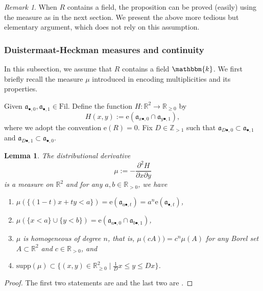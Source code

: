 \documentclass[11pt, leqno]{amsart}%
\theoremstyle{plain}
\newtheorem{lemma}[theorem]{Lemma}
\theoremstyle{definition}
\theoremstyle{remark}
\newtheorem{remark}[theorem]{Remark}
\newcommand{\bR}{\mathbb{R}}
\newcommand{\bZ}{\mathbb{Z}}
\newcommand{\fa}{\mathfrak{a}}
\newcommand{\supp}{\mathrm{supp}}
\newcommand{\bk}{\mathbbm{k}}
\newcommand{\e}{\mathrm{e}}
\newcommand{\Fil}{\mathrm{Fil}}
\numberwithin{equation}{section}
\begin{document}
\begin{remark}
    When $R$ contains a field, the proposition can be proved (easily) using the measure as in the next section. We present the above more tedious but elementary argument, which does not rely on this assumption.
\end{remark}







\subsubsection{Duistermaat-Heckman measures and continuity}

In this subsection, we assume that $R$ contains a field $\bk$. We first briefly recall the measure $\mu$ introduced in \cite[Section 4]{BLQ22} encoding multiplicities and its properties.

Given $\fa_{\bullet,0},\fa_{\bullet,1}\in\Fil$. Define the function $H:\bR^2\to \bR_{\ge 0}$ by
\[
    H(x,y):=\e(\fa_{x\bullet,0}\cap\fa_{y\bullet,1}),
\]
where we adopt the convention $\e(R)=0$. Fix $D\in\bZ_{>1}$ such that $\fa_{D\bullet,0}\subset \fa_{\bullet,1}$ and $\fa_{D\bullet,1}\subset\fa_{\bullet,0}$. 

\begin{lemma}\cite{BLQ22}\label{lem:properties of the measure}
    The distributional derivative 
    \[
        \mu:=-\frac{\partial^2 H}{\partial x \partial y}
    \]
    is a measure on $\bR^2$ and for any $a,b\in\bR_{>0}$, we have
    \begin{enumerate}
        \item $\mu(\{(1-t)x+ty< a \})=\e(\fa_{a\bullet,t})=a^n\e(\fa_{\bullet ,t})$,
		
        \item $\mu\left( \{x<a\} \cup \{y<b\}\right)= \e(\fa_{a\bullet,0 } \cap \fa_{b\bullet,1})$, 
		
        \item $\mu$ is homogeneous of degree $n$, that is, $\mu(cA))=c^n\mu(A)$ for any Borel set $A\subset \bR^2$ and $c\in\bR_{>0}$, and
		
        \item $\supp(\mu)\subset \{(x,y)\in\bR_{\ge 0}^2\mid \frac{1}{D}x\le y\le Dx\}$.
    \end{enumerate}
\end{lemma}

\begin{proof}
    The first two statements are \cite[Proposition 4.7]{BLQ22} and the last two are \cite[Proposition 4.9]{BLQ22}.
\end{proof}
\end{document}
